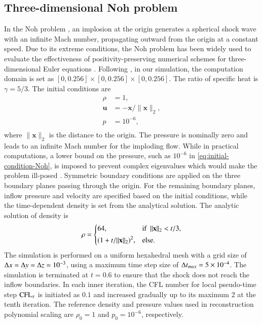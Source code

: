\subsection{Three-dimensional Noh problem}

In the Noh problem \cite{noh1987errors}, an implosion at the origin generates a spherical shock wave with an infinite Mach number, propagating outward from the origin at a constant speed. 
Due to its extreme conditions, the Noh problem has been widely used to evaluate the effectiveness of positivity-preserving numerical schemes for three-dimensional Euler equations \cite{hu2013positivity}.
Following \cite{johnsen2010assessment}, 
in our simulation, the computation domain is set as
$[0,0.256]\times[0,0.256]\times[0,0.256]$. The ratio of specific heat is $\gamma=5/3$.
The initial conditions are
\begin{equation}
\label{eq:initial-condition-Noh}
    \begin{aligned}
        \rho & = 1, \\
        \mathbf{u}  &= -\mathbf{x} /\|\mathbf{x}\|_2, \\
        p & = 10^{-6},\\
    \end{aligned}
\end{equation}
where $\|\mathbf{x}\|_2$ is the distance to the 
origin. The pressure is nominally zero and leads to an infinite Mach number for the imploding flow. While in practical computations, a lower bound on the pressure, such as $10^{-6}$ in \eqref{eq:initial-condition-Noh}, is imposed to prevent complex eigenvalues which would make the problem ill-posed \cite{johnsen2010assessment}.
Symmetric boundary conditions are applied on the three boundary planes passing through the origin. For the remaining boundary planes, inflow pressure and velocity are specified based on the initial conditions, while the time-dependent density is set from the analytical solution.
The analytic solution of density \cite{noh1987errors} is 
\begin{equation}
    \rho = 
    \begin{dcases}
        64, & \text{if } \ \|\mathbf{x}\|_2<t/3, \\
        (1+t/\|\mathbf{x}\|_2)^2,  & \text{else}.
    \end{dcases}
\end{equation}
The simulation is performed on a uniform hexahedral mesh with a grid size of $\mathrm\Delta x = \mathrm\Delta y= \mathrm\Delta z = 10^{-3}$, using a maximum time step size of $\mathrm\Delta t_{max}=5 \times 10^{-4}$. The simulation is terminated at $t=0.6$ to ensure that the 
shock does not reach the inflow boundaries. 
In each inner iteration, the CFL number for local pseudo-time step $\text{CFL}_\tau$ is initiated as $0.1$
and increased gradually up to its maximum $2$ at the tenth iteration.
The reference density and pressure values used in reconstruction polynomial scaling are $\rho_0=1$ and $p_0=10^{-6}$, respectively. 

